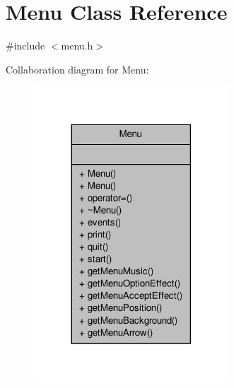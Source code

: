 \hypertarget{classMenu}{\section{Menu Class Reference}
\label{classMenu}
}


{\ttfamily \#include $<$menu.\-h$>$}



Collaboration diagram for Menu\-:\nopagebreak
\begin{figure}[H]
\begin{center}
\leavevmode
\includegraphics[width=206pt]{classMenu__coll__graph}
\end{center}
\end{figure}
